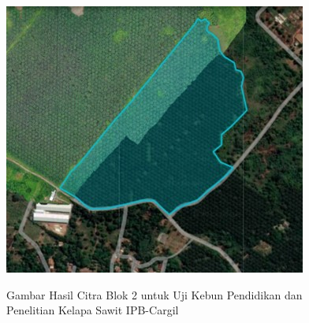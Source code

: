 \begin{figure}[H]
	\vspace{-0.1cm}
	\begin{center}
		\includegraphics[width=0.7\columnwidth]{lampiran/Picture3.jpg}
	\end{center}
	\vspace{-0.2cm}
	\captionsetup{justification=centering}
	Gambar Hasil Citra Blok 2 untuk Uji Kebun Pendidikan dan Penelitian Kelapa Sawit IPB-Cargil
\end{figure}

